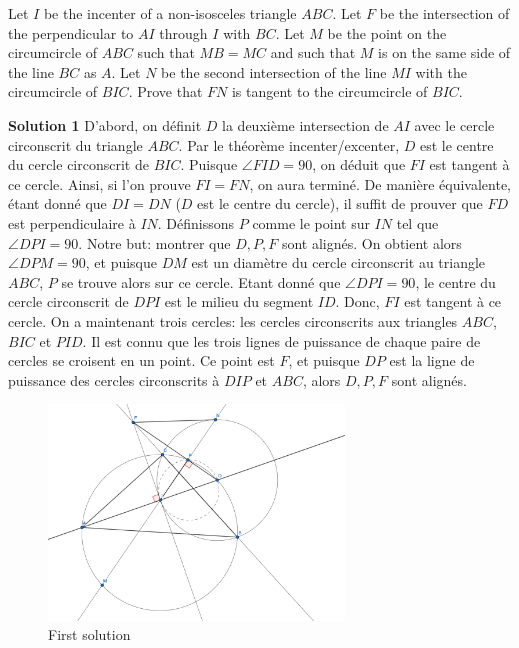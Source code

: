 Let $I$ be the incenter of a non-isosceles triangle $ABC$. Let $F$ be the intersection of the perpendicular to $AI$ through $I$ with $BC$. Let $M$ be the point on the circumcircle of $ABC$ such that $MB=MC$ and such that $M$ is on the same side of the line $BC$ as $A$. Let $N$ be the second intersection of the line $MI$ with the circumcircle of $BIC$. Prove that $FN$ is tangent to the circumcircle of $BIC$.

\textbf{Solution 1}
D'abord, on définit $D$ la deuxième intersection de $AI$ avec le cercle circonscrit du triangle $ABC$. Par le théorème incenter/excenter, $D$ est le centre du cercle circonscrit de $BIC$. Puisque $\angle FID = 90$, on déduit que $FI$ est tangent à ce cercle. Ainsi, si l'on prouve $FI = FN$, on aura terminé. De manière équivalente, étant donné que $DI = DN$ ($D$ est le centre du cercle), il suffit de prouver que $FD$ est perpendiculaire à $IN$. Définissons $P$ comme le point sur $IN$ tel que $\angle DPI = 90$. Notre but: montrer que $D,P,F$ sont alignés. On obtient alors $\angle DPM = 90$, et puisque $DM$ est un diamètre du cercle circonscrit au triangle $ABC$, $P$ se trouve alors sur ce cercle. Etant donné que $\angle DPI = 90$, le centre du cercle circonscrit de $DPI$ est le milieu du segment $ID$. Donc, $FI$ est tangent à ce cercle. On a maintenant trois cercles: les cercles circonscrits aux triangles $ABC$, $BIC$ et $PID$. Il est connu que les trois lignes de puissance de chaque paire de cercles se croisent en un point. Ce point est $F$, et puisque $DP$ est la ligne de puissance des cercles circonscrits à $DIP$ et $ABC$, alors $D,P,F$ sont alignés.

\begin{figure}[h!]
    \centering
    \includegraphics[width = 0.7\textwidth]{solutions/P8_1.png}
    \caption{First solution}
\end{figure}

